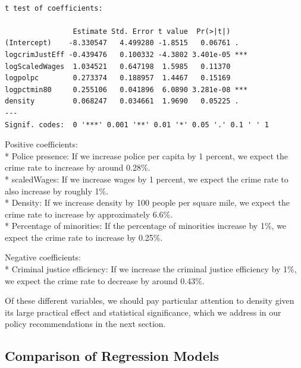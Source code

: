 \documentclass[]{article}
\begin{document}
\begin{verbatim}

t test of coefficients:

                Estimate Std. Error t value  Pr(>|t|)    
(Intercept)    -8.330547   4.499280 -1.8515   0.06761 .  
logcrimJustEff -0.439476   0.100332 -4.3802 3.401e-05 ***
logScaledWages  1.034521   0.647198  1.5985   0.11370    
logpolpc        0.273374   0.188957  1.4467   0.15169    
logpctmin80     0.255106   0.041896  6.0890 3.281e-08 ***
density         0.068247   0.034661  1.9690   0.05225 .  
---
Signif. codes:  0 '***' 0.001 '**' 0.01 '*' 0.05 '.' 0.1 ' ' 1
\end{verbatim}

Positive coefficients:\\
* Police presence: If we increase police per capita by 1 percent, we
expect the crime rate to increase by around 0.28\%.\\
* scaledWages: If we increase wages by 1 percent, we expect the crime
rate to also increase by roughly 1\%.\\
* Density: If we increase density by 100 people per square mile, we
expect the crime rate to increase by approximately 6.6\%.\\
* Percentage of minorities: If the percentage of minorities increase by
1\%, we expect the crime rate to increase by 0.25\%.

Negative coefficients:\\
* Criminal justice efficiency: If we increase the criminal justice
efficiency by 1\%, we expect the crime rate to decrease by around
0.43\%.

Of these different variables, we should pay particular attention to
density given its large practical effect and statistical significance,
which we address in our policy recommendations in the next section.

\hypertarget{comparison-of-regression-models}{%
\subsection{Comparison of Regression
Models}\label{comparison-of-regression-models}}
\end{document}
